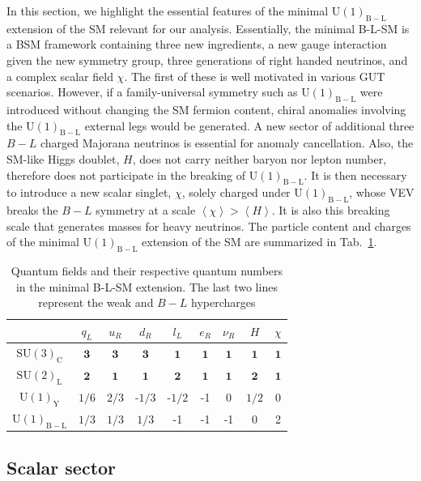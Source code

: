 \documentclass[10pt]{report}
\newcommand{\mean}[1]{\left \langle #1 \right \rangle }
\newcommand{\U}[1]{\mathrm{U}(1)_{\mathrm{#1}}}
\begin{document}
In this section, we highlight the essential features of the minimal $\U{B-L}$ extension of the SM relevant for our analysis. Essentially, the minimal B-L-SM is a BSM framework containing three new ingredients, a new gauge interaction given the new symmetry group, three generations of right handed neutrinos, and a complex scalar field $\chi$. 
%
The first of these is well motivated in various GUT scenarios.
%
However, if a family-universal symmetry such as $\U{B-L}$ were introduced without changing the SM fermion content, chiral anomalies involving the $\U{B-L}$ external legs would be generated. A new sector of additional three $B-L$ charged Majorana neutrinos is essential for anomaly cancellation. Also, the SM-like Higgs doublet, $H$, does not carry neither baryon nor lepton number, therefore does not participate in the breaking of $\U{B-L}$. It is then necessary to introduce a new scalar singlet, $\chi$, solely charged under $\U{B-L}$, whose VEV breaks the $B-L$ symmetry at a scale $\mean{\chi} > \mean{H}$. It is also this breaking scale that generates masses for heavy neutrinos. The particle content and charges of the minimal $\U{B-L}$ extension of the SM are summarized in Tab.~\ref{tab:BLSM_Charges}.

\begin{table}[H]
	\centering
	\begin{tabular}{|c|c|c|c|c|c|c|c|c|}
		\hline
		& $q_L$  & $u_R$ & $d_R$ & $l_L$  & $e_R$ & $\nu_R$  &  $H$  & $\chi$  \\ \hline
		$\mathrm{SU(3)_C}$& $\mathbf{3}$ & $\mathbf{3}$  & $\mathbf{3}$  & $\mathbf{1}$  & $\mathbf{1}$   & $\mathbf{1}$   & $\mathbf{1}$    & $\mathbf{1}$    \\
		$\mathrm{SU(2)_L}$& $\mathbf{2}$  & $\mathbf{1}$ & $\mathbf{1}$ & $\mathbf{2}$ & $\mathbf{1}$ & $\mathbf{1}$ & $\mathbf{2}$  & $\mathbf{1}$ \\
		$\mathrm{U(1)_Y}$ & ${1}/{6}$ & ${2}/{3}$  & -${1}/{3}$  & -${1}/{2}$ & -1 & 0 & ${1}/{2}$ & 0 \\
		$\mathrm{U(1)_{B-L}}$ & ${1}/{3}$ & ${1}/{3}$ & ${1}/{3}$  & -1  & -1 &-1  & 0 & 2  \\ \hline 
	\end{tabular}
	\caption{Quantum fields and their respective quantum numbers in the minimal B-L-SM extension. The last two lines represent the weak and $B-L$ hypercharges}
	\label{tab:BLSM_Charges}
\end{table} 

\subsection{Scalar sector}
\end{document}
